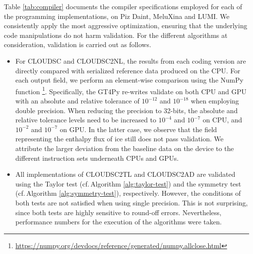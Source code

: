\documentclass[main.tex]{subfiles}
\begin{document}
    \noindent Table \ref{tab:compiler} documents the compiler specifications employed for each of the programming implementations, on Piz Daint, MeluXina and LUMI. We consistently apply the most aggressive optimization, ensuring that the underlying code manipulations do not harm validation. For the different algorithms at consideration, validation is carried out as follows.
    \begin{itemize}
        \item For CLOUDSC and CLOUDSC2NL, the results from each coding version are directly compared with serialized reference data produced on the CPU. For each output field, we perform an element-wise comparison using the NumPy function \footnote{\url{https://numpy.org/devdocs/reference/generated/numpy.allclose.html}}. Specifically, the GT4Py re-writes validate on both CPU and GPU with an absolute and relative tolerance of $10^{-12}$ and $10^{-18}$ when employing double precision. When reducing the precision to 32-bits, the absolute and relative tolerance levels need to be increased to $10^{-4}$ and $10^{-7}$ on CPU, and $10^{-2}$ and $10^{-7}$ on GPU. In the latter case, we observe that the field representing the enthalpy flux of ice still does not pass validation. We attribute the larger deviation from the baseline data on the device to the different instruction sets underneath CPUs and GPUs.
        \item All implementations of CLOUDSC2TL and CLOUDSC2AD are validated using the Taylor test (cf.\,Algorithm \ref{alg:taylor-test}) and the symmetry test (cf.\,Algorithm \ref{alg:symmetry-test}), respectively. However, the conditions of both tests are not satisfied when using single precision. This is not surprising, since both tests are highly sensitive to round-off errors. Nevertheless, performance numbers for the execution of the algorithms were taken.
    \end{itemize}
\end{document}
